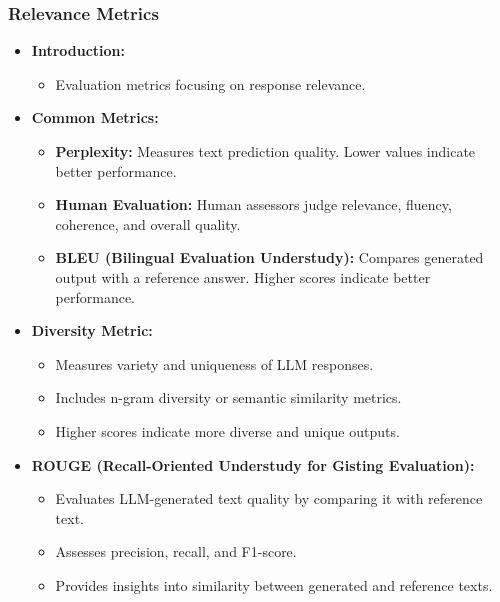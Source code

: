 \begin{frame}[fragile]\frametitle{Relevance Metrics}
  \begin{itemize}
    \item \textbf{Introduction:}
      \begin{itemize}
        \item Evaluation metrics focusing on response relevance.
      \end{itemize}
    \item \textbf{Common Metrics:}
      \begin{itemize}
        \item \textbf{Perplexity:} Measures text prediction quality. Lower values indicate better performance.
        \item \textbf{Human Evaluation:} Human assessors judge relevance, fluency, coherence, and overall quality.
        \item \textbf{BLEU (Bilingual Evaluation Understudy):} Compares generated output with a reference answer. Higher scores indicate better performance.
      \end{itemize}
    \item \textbf{Diversity Metric:}
      \begin{itemize}
        \item Measures variety and uniqueness of LLM responses.
        \item Includes n-gram diversity or semantic similarity metrics.
        \item Higher scores indicate more diverse and unique outputs.
      \end{itemize}
    \item \textbf{ROUGE (Recall-Oriented Understudy for Gisting Evaluation):}
      \begin{itemize}
        \item Evaluates LLM-generated text quality by comparing it with reference text.
        \item Assesses precision, recall, and F1-score.
        \item Provides insights into similarity between generated and reference texts.
      \end{itemize}
  \end{itemize}
\end{frame}

